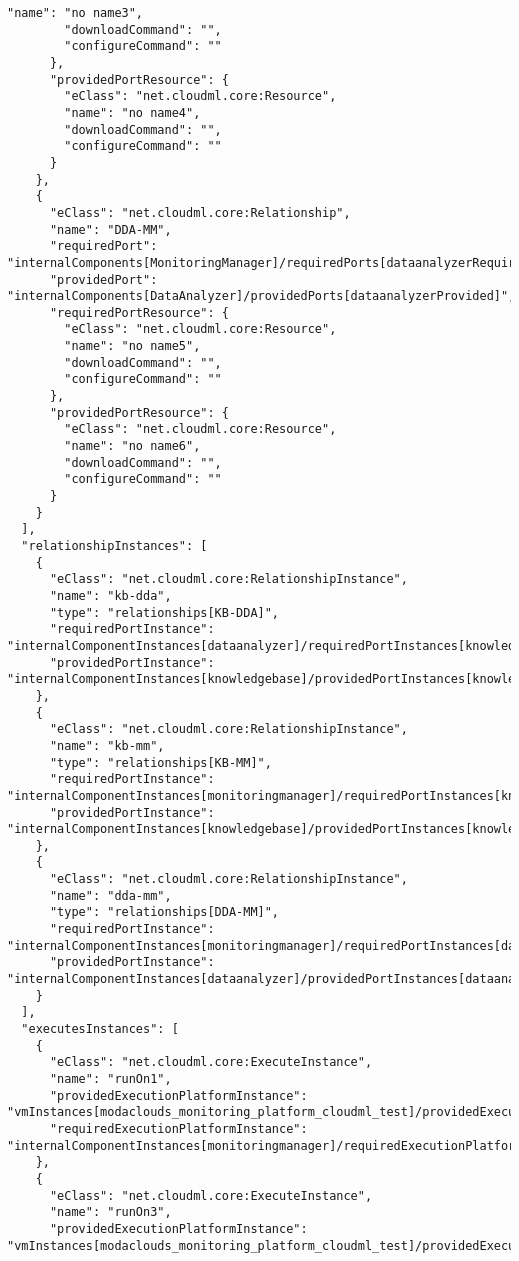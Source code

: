 \begin{lstlisting}[mathescape,caption={The .json to deplot the \mm on Flexiant},label={lst:mpflexi}]
        "name": "no name3",
        "downloadCommand": "",
        "configureCommand": ""
      },
      "providedPortResource": {
        "eClass": "net.cloudml.core:Resource",
        "name": "no name4",
        "downloadCommand": "",
        "configureCommand": ""
      }
    },
    {
      "eClass": "net.cloudml.core:Relationship",
      "name": "DDA-MM",
      "requiredPort": "internalComponents[MonitoringManager]/requiredPorts[dataanalyzerRequired]",
      "providedPort": "internalComponents[DataAnalyzer]/providedPorts[dataanalyzerProvided]",
      "requiredPortResource": {
        "eClass": "net.cloudml.core:Resource",
        "name": "no name5",
        "downloadCommand": "",
        "configureCommand": ""
      },
      "providedPortResource": {
        "eClass": "net.cloudml.core:Resource",
        "name": "no name6",
        "downloadCommand": "",
        "configureCommand": ""
      }
    }
  ],
  "relationshipInstances": [
    {
      "eClass": "net.cloudml.core:RelationshipInstance",
      "name": "kb-dda",
      "type": "relationships[KB-DDA]",
      "requiredPortInstance": "internalComponentInstances[dataanalyzer]/requiredPortInstances[knowledgebaseRequiredPort]",
      "providedPortInstance": "internalComponentInstances[knowledgebase]/providedPortInstances[knowledgebaseProvidedPort]"
    },
    {
      "eClass": "net.cloudml.core:RelationshipInstance",
      "name": "kb-mm",
      "type": "relationships[KB-MM]",
      "requiredPortInstance": "internalComponentInstances[monitoringmanager]/requiredPortInstances[knowledgebaseRequiredPort]",
      "providedPortInstance": "internalComponentInstances[knowledgebase]/providedPortInstances[knowledgebaseProvidedPort]"
    },
    {
      "eClass": "net.cloudml.core:RelationshipInstance",
      "name": "dda-mm",
      "type": "relationships[DDA-MM]",
      "requiredPortInstance": "internalComponentInstances[monitoringmanager]/requiredPortInstances[dataanalyzerRequiredPort]",
      "providedPortInstance": "internalComponentInstances[dataanalyzer]/providedPortInstances[dataanalyzerProvidedPort]"
    }
  ],
  "executesInstances": [
    {
      "eClass": "net.cloudml.core:ExecuteInstance",
      "name": "runOn1",
      "providedExecutionPlatformInstance": "vmInstances[modaclouds_monitoring_platform_cloudml_test]/providedExecutionPlatformInstances[vmProvided]",
      "requiredExecutionPlatformInstance": "internalComponentInstances[monitoringmanager]/requiredExecutionPlatformInstance[vmRequired1]"
    },
    {
      "eClass": "net.cloudml.core:ExecuteInstance",
      "name": "runOn3",
      "providedExecutionPlatformInstance": "vmInstances[modaclouds_monitoring_platform_cloudml_test]/providedExecutionPlatformInstances[vmProvided]",

\end{lstlisting}
